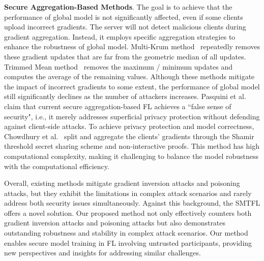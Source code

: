 \textbf{Secure Aggregation-Based Methods}. The goal is to achieve that the performance of global model is not significantly affected, even if some clients upload incorrect gradients. The server will not detect malicious clients during gradient aggregation. Instead, it employs specific aggregation strategies to enhance the robustness of global model. Multi-Krum method~\cite{10.5555/3294771.3294783} repeatedly removes these gradient updates that are far from the geometric median of all updates. Trimmed Mean method~\cite{yin2021} removes the maximum / minimum updates and computes the average of the remaining values. Although these methods mitigate the impact of incorrect gradients to some extent, the performance of global model still significantly declines as the number of attackers increases. Pasquini et al.~\cite{10.1145/3548606.3560557} claim that current secure aggregation-based FL achieves a ``false sense of security", i.e., it merely addresses superficial privacy protection without defending against client-side attacks. To achieve privacy protection and model correctness, Chowdhury et al.~\cite{roy2022eiffel} split and aggregate the clients' gradients through the Shamir threshold secret sharing scheme and non-interactive proofs. This method has high computational complexity, making it challenging to balance the model robustness with the computational efficiency.

Overall, existing methods mitigate gradient inversion attacks and poisoning attacks, but they exhibit the limitations in complex attack scenarios and rarely address both security issues simultaneously. Against this background, the SMTFL offers a novel solution. Our proposed method not only effectively counters both gradient inversion attacks and poisoning attacks but also demonstrates outstanding robustness and stability in complex attack scenarios. Our method enables secure model training in FL involving untrusted participants, providing new perspectives and insights for addressing similar challenges.